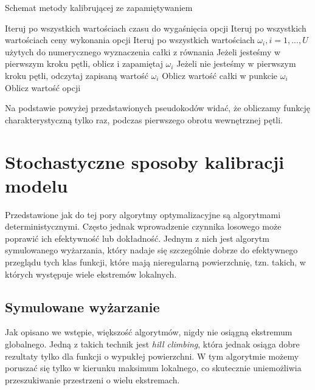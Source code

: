 \documentclass{pracamgr}
\begin{document}
\begin{algorithm}[H]
\caption{Schemat metody kalibrującej ze zapamiętywaniem}\label{euclid}

\begin{algorithmic}[1]
  
  \State Iteruj po wszystkich wartościach czasu do wygaśnięcia opcji
  \State Iteruj po wszystkich wartościach ceny wykonania opcji
  \State Iteruj po wszystkich wartościach $\omega_i, i = 1, ..., U $ użytych do numerycznego wyznaczenia całki z równania   
  \State Jeżeli jesteśmy w pierwszym kroku pętli, oblicz i zapamiętaj $\omega_i$
  \State Jeżeli nie jesteśmy w pierwszym kroku pętli, odczytaj zapisaną wartość $\omega_i$
  \State Oblicz wartość całki w punkcie $\omega_i$
  \State Oblicz wartość opcji

\end{algorithmic}
\label{alg:simulatedAnnealing}
\end{algorithm}




Na podstawie powyżej przedstawionych pseudokodów widać, że obliczamy funkcję 
charakterystyczną tylko raz, podczas pierwszego obrotu wewnętrznej pętli.



\section{Stochastyczne sposoby kalibracji modelu}
Przedstawione jak do tej pory algorytmy optymalizacyjne są algorytmami deterministycznymi.
Często jednak wprowadzenie czynnika losowego może poprawić ich efektywność lub dokładność. Jednym z
nich jest algorytm symulowanego wyżarzania, który nadaje się szczególnie dobrze do efektywnego
przeglądu tych klas funkcji, które mają nieregularną powierzchnię, tzn. takich, w których występuje
wiele ekstremów lokalnych.

\subsection{Symulowane wyżarzanie}

Jak opisano we wstępie, większość algorytmów, nigdy nie osiągną ekstremum
globalnego. Jedną z takich technik jest \textit{hill climbing}, która jednak 
osiąga dobre rezultaty tylko dla funkcji o wypukłej powierzchni. W tym algorytmie możemy poruszać się
tylko w kierunku maksimum lokalnego, co skutecznie uniemożliwia przeszukiwanie przestrzeni o wielu
ekstremach.
\end{document}
